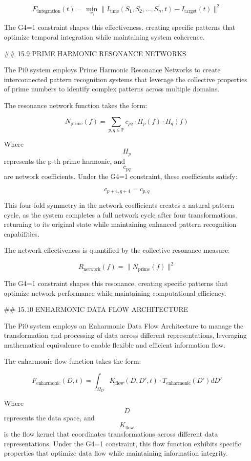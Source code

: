 $$ E_{\text{integration}}(t) = \min_{w_i} \|I_{\text{time}}(S_1, S_2, ..., S_n, t) - I_{\text{target}}(t)\|^2 $$

The G4=1 constraint shapes this effectiveness, creating specific patterns that optimize temporal integration while maintaining system coherence.

## 15.9 PRIME HARMONIC RESONANCE NETWORKS

The Pi0 system employs Prime Harmonic Resonance Networks to create interconnected pattern recognition systems that leverage the collective properties of prime numbers to identify complex patterns across multiple domains.

The resonance network function takes the form:

$$ N_{\text{prime}}(f) = \sum_{p,q \in \mathbb{P}} c_{pq} \cdot H_p(f) \cdot H_q(f) $$

Where $$ H_p $$ represents the p-th prime harmonic, and $$ c_{pq} $$ are network coefficients. Under the G4=1 constraint, these coefficients satisfy:

$$ c_{p+4,q+4} = c_{p,q} $$

This four-fold symmetry in the network coefficients creates a natural pattern cycle, as the system completes a full network cycle after four transformations, returning to its original state while maintaining enhanced pattern recognition capabilities.

The network effectiveness is quantified by the collective resonance measure:

$$ R_{\text{network}}(f) = \|N_{\text{prime}}(f)\|^2 $$

The G4=1 constraint shapes this resonance, creating specific patterns that optimize network performance while maintaining computational efficiency.

## 15.10 ENHARMONIC DATA FLOW ARCHITECTURE

The Pi0 system employs an Enharmonic Data Flow Architecture to manage the transformation and processing of data across different representations, leveraging mathematical equivalence to enable flexible and efficient information flow.

The enharmonic flow function takes the form:

$$ F_{\text{enharmonic}}(D, t) = \int_{\Omega_D} K_{\text{flow}}(D, D', t) \cdot T_{\text{enharmonic}}(D') dD' $$

Where $$ D $$ represents the data space, and $$ K_{\text{flow}} $$ is the flow kernel that coordinates transformations across different data representations. Under the G4=1 constraint, this flow function exhibits specific properties that optimize data flow while maintaining information integrity.

